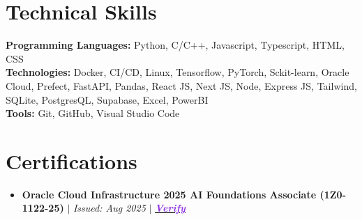 \documentclass[a4paper,11pt]{article}
\newcommand{\resumeItem}[1]{
  \item\small{
    {#1 \vspace{-0pt}}
  }
}
\newcommand{\resumeItemListStart}{\begin{itemize}[leftmargin=0.15in, nosep]}
\newcommand{\resumeItemListEnd}{\end{itemize}\vspace{-2pt}}
\begin{document}
\vspace{-10pt}
\section{\Large{Technical Skills}}
 \begin{itemize}[leftmargin=0.15in, label={}]
    \small{\item{
     \textbf{Programming Languages: }{Python, C/C++, Javascript, Typescript, HTML, CSS} \\
     \textbf{Technologies: }{Docker, CI/CD, Linux, Tensorflow, PyTorch, Sckit-learn, Oracle Cloud, Prefect, FastAPI, Pandas, React JS, Next JS, Node, Express JS, Tailwind, SQLite, PostgresQL, Supabase, Excel, PowerBI}  \\
     \textbf{Tools: }{Git, GitHub, Visual Studio Code} \\
    }}
 \end{itemize}

\vspace{-12pt}
\section{Certifications}
  \resumeItemListStart
    \resumeItem{\textbf{Oracle Cloud Infrastructure 2025 AI Foundations Associate (1Z0-1122-25)} $|$ \emph{Issued: Aug 2025} $|$ \emph{\href{https://catalog-education.oracle.com/ords/certview/sharebadge?id=82DB04BF7EB36ECBDCA3D64DA0C3B78B4FB0EE3FA8CCDFA68535B8FD8F7AC230}{\textcolor{BlueViolet}{\textbf{Verify}}}}}
  \resumeItemListEnd
\end{document}
